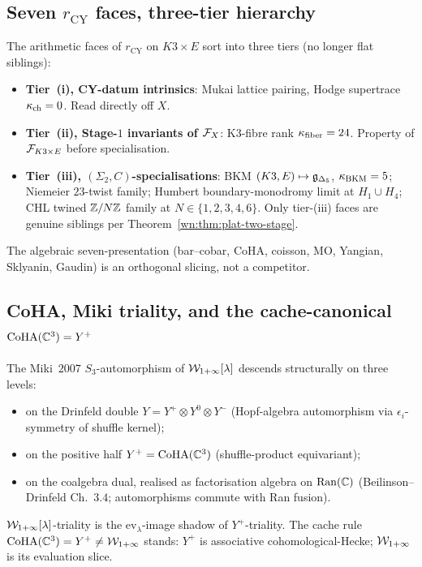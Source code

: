 \subsection{Seven $r_{\mathrm{CY}}$ faces, three-tier hierarchy}
\label{wn:subsec:plat-7-faces}

\begin{theorem}\ClaimStatusTheorem
\label{wn:thm:plat-three-tier}
The arithmetic faces of $r_{\mathrm{CY}}$ on $K3 \times E$ sort into three
tiers (no longer flat siblings):
\begin{itemize}
\item \textbf{Tier~(i), CY-datum intrinsics}: Mukai lattice pairing,
Hodge supertrace $\kappa_{\mathrm{ch}} = 0$. Read directly off $X$.
\item \textbf{Tier~(ii), Stage-$1$ invariants of $\mathcal{F}_X$}:
K3-fibre rank $\kappa_{\mathrm{fiber}} = 24$. Property of $\mathcal{F}_{K3 \times E}$
before specialisation.
\item \textbf{Tier~(iii), $(\Sigma_2, C)$-specialisations}:
BKM $(K3, E) \mapsto \mathfrak{g}_{\Delta_5}$, $\kappa_{\mathrm{BKM}} = 5$;
Niemeier $23$-twist family;
Humbert boundary-monodromy limit at $H_1 \cup H_4$;
CHL twined $\mathbb{Z}/N\mathbb{Z}$ family at $N \in \{1, 2, 3, 4, 6\}$.
Only tier-(iii) faces are genuine siblings per
Theorem~\ref{wn:thm:plat-two-stage}.
\end{itemize}
The algebraic seven-presentation (bar--cobar, CoHA, coisson, MO, Yangian,
Sklyanin, Gaudin) is an orthogonal slicing, not a competitor.
\end{theorem}

\subsection{CoHA, Miki triality, and the cache-canonical
$\mathrm{CoHA}(\mathbb{C}^3) = Y^+$}
\label{wn:subsec:plat-CoHA-Miki}

\begin{theorem}\ClaimStatusTheorem
\label{wn:thm:plat-Miki-S3}
The Miki~$2007$ $S_3$-automorphism of $\mathcal{W}_{1+\infty}[\lambda]$ descends
structurally on three levels:
\begin{itemize}
\item on the Drinfeld double $Y = Y^+ \otimes Y^0 \otimes Y^-$
(Hopf-algebra automorphism via $\epsilon_i$-symmetry of shuffle kernel);
\item on the positive half $Y^+ = \mathrm{CoHA}(\mathbb{C}^3)$ (shuffle-product
equivariant);
\item on the coalgebra dual, realised as factorisation algebra on
$\mathrm{Ran}(\mathbb{C})$ (Beilinson--Drinfeld Ch.~$3.4$; automorphisms commute
with Ran fusion).
\end{itemize}
$\mathcal{W}_{1+\infty}[\lambda]$-triality is the $\mathrm{ev}_\lambda$-image shadow of
$Y^+$-triality. The cache rule $\mathrm{CoHA}(\mathbb{C}^3) = Y^+ \neq \mathcal{W}_{1+\infty}$ stands:
$Y^+$ is associative cohomological-Hecke; $\mathcal{W}_{1+\infty}$ is its evaluation slice.
\end{theorem}

